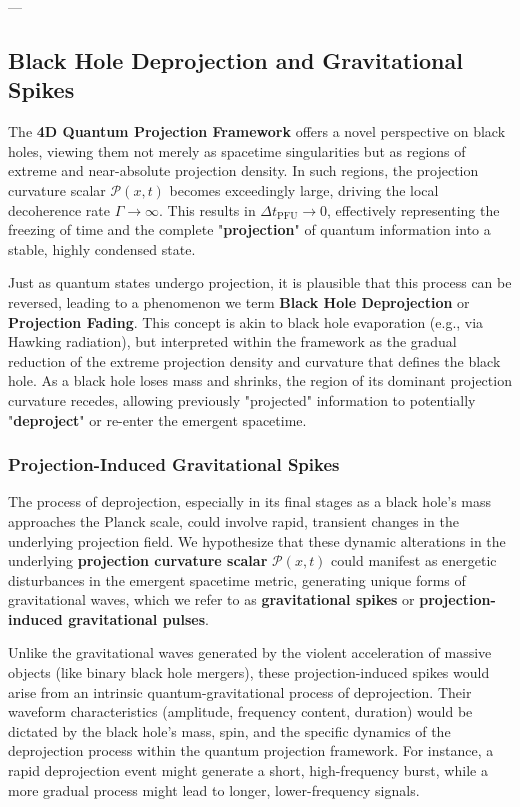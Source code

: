 \documentclass[12pt,a4paper]{article}
\numberwithin{equation}{section}
\begin{document}
---

\subsection{Black Hole Deprojection and Gravitational Spikes}
The \textbf{4D Quantum Projection Framework} offers a novel perspective on black holes, viewing them not merely as spacetime singularities but as regions of extreme and near-absolute projection density. In such regions, the projection curvature scalar $\mathcal{P}(x, t)$ becomes exceedingly large, driving the local decoherence rate $\Gamma \to \infty$. This results in $\Delta t_{\text{PFU}} \to 0$, effectively representing the freezing of time and the complete "\textbf{projection}" of quantum information into a stable, highly condensed state.

Just as quantum states undergo projection, it is plausible that this process can be reversed, leading to a phenomenon we term \textbf{Black Hole Deprojection} or \textbf{Projection Fading}. This concept is akin to black hole evaporation (e.g., via Hawking radiation), but interpreted within the framework as the gradual reduction of the extreme projection density and curvature that defines the black hole. As a black hole loses mass and shrinks, the region of its dominant projection curvature recedes, allowing previously "projected" information to potentially "\textbf{deproject}" or re-enter the emergent spacetime.

\subsubsection{Projection-Induced Gravitational Spikes}
The process of deprojection, especially in its final stages as a black hole's mass approaches the Planck scale, could involve rapid, transient changes in the underlying projection field. We hypothesize that these dynamic alterations in the underlying \textbf{projection curvature scalar} $\mathcal{P}(x, t)$ could manifest as energetic disturbances in the emergent spacetime metric, generating unique forms of gravitational waves, which we refer to as \textbf{gravitational spikes} or \textbf{projection-induced gravitational pulses}.

Unlike the gravitational waves generated by the violent acceleration of massive objects (like binary black hole mergers), these projection-induced spikes would arise from an intrinsic quantum-gravitational process of deprojection. Their waveform characteristics (amplitude, frequency content, duration) would be dictated by the black hole's mass, spin, and the specific dynamics of the deprojection process within the quantum projection framework. For instance, a rapid deprojection event might generate a short, high-frequency burst, while a more gradual process might lead to longer, lower-frequency signals.
\end{document}
